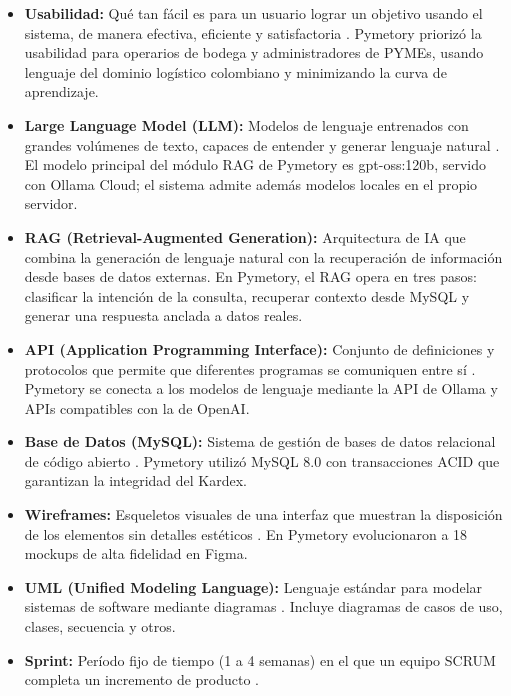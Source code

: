 \begin{itemize}
    \item \textbf{Usabilidad:} Qué tan fácil es para un usuario lograr un objetivo usando el sistema, de manera efectiva, eficiente y satisfactoria \cite{nielsen1994heuristics}. Pymetory priorizó la usabilidad para operarios de bodega y administradores de PYMEs, usando lenguaje del dominio logístico colombiano y minimizando la curva de aprendizaje.
    
    \item \textbf{Large Language Model (LLM):} Modelos de lenguaje entrenados con grandes volúmenes de texto, capaces de entender y generar lenguaje natural \cite{zhao2023surveyllm}. El modelo principal del módulo RAG de Pymetory es gpt-oss:120b, servido con Ollama Cloud; el sistema admite además modelos locales en el propio servidor.
    
    \item \textbf{RAG (Retrieval-Augmented Generation):} Arquitectura de IA que combina la generación de lenguaje natural con la recuperación de información desde bases de datos externas. En Pymetory, el RAG opera en tres pasos: clasificar la intención de la consulta, recuperar contexto desde MySQL y generar una respuesta anclada a datos reales.
    
    \item \textbf{API (Application Programming Interface):} Conjunto de definiciones y protocolos que permite que diferentes programas se comuniquen entre sí \cite{pressman2014software}. Pymetory se conecta a los modelos de lenguaje mediante la API de Ollama y APIs compatibles con la de OpenAI.
    
    \item \textbf{Base de Datos (MySQL):} Sistema de gestión de bases de datos relacional de código abierto \cite{mysql_docs}. Pymetory utilizó MySQL 8.0 con transacciones ACID que garantizan la integridad del Kardex.
    
    \item \textbf{Wireframes:} Esqueletos visuales de una interfaz que muestran la disposición de los elementos sin detalles estéticos \cite{pressman2014software}. En Pymetory evolucionaron a 18 mockups de alta fidelidad en Figma.
    
    \item \textbf{UML (Unified Modeling Language):} Lenguaje estándar para modelar sistemas de software mediante diagramas \cite{omg_uml}. Incluye diagramas de casos de uso, clases, secuencia y otros.
    
    \item \textbf{Sprint:} Período fijo de tiempo (1 a 4 semanas) en el que un equipo SCRUM completa un incremento de producto \cite{schwaber2020scrumguide}.
    

\end{itemize}
